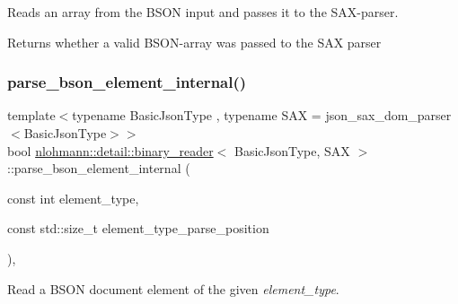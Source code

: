 Reads an array from the B\+S\+ON input and passes it to the S\+A\+X-\/parser. 

\begin{DoxyReturn}{Returns}
whether a valid B\+S\+O\+N-\/array was passed to the S\+AX parser 
\end{DoxyReturn}
\mbox{\label{classnlohmann_1_1detail_1_1binary__reader_a2fdd24de008063e7fef896327daeffa1}} 
\subsubsection{\texorpdfstring{parse\+\_\+bson\+\_\+element\+\_\+internal()}{parse\_bson\_element\_internal()}}
{\footnotesize\ttfamily template$<$typename Basic\+Json\+Type , typename S\+AX  = json\+\_\+sax\+\_\+dom\+\_\+parser$<$\+Basic\+Json\+Type$>$$>$ \\
bool \hyperlink{classnlohmann_1_1detail_1_1binary__reader}{nlohmann\+::detail\+::binary\+\_\+reader}$<$ Basic\+Json\+Type, S\+AX $>$\+::parse\+\_\+bson\+\_\+element\+\_\+internal (\begin{DoxyParamCaption}\item[{const int}]{element\+\_\+type,  }\item[{const std\+::size\+\_\+t}]{element\+\_\+type\+\_\+parse\+\_\+position }\end{DoxyParamCaption})\hspace{0.3cm}{\ttfamily [inline]}, {\ttfamily [private]}}



Read a B\+S\+ON document element of the given {\itshape element\+\_\+type}. 


